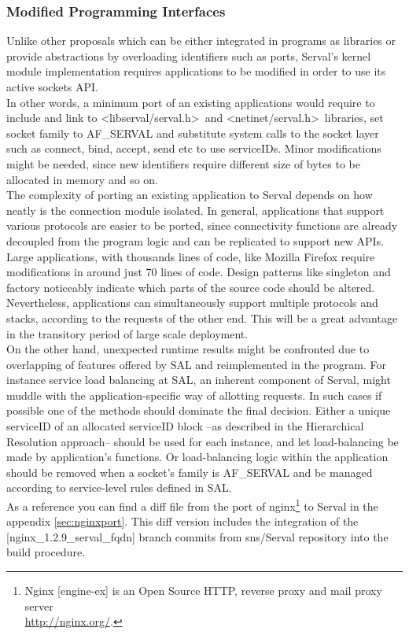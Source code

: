 \subsubsection{Modified Programming Interfaces}
Unlike other proposals which can be either integrated in programs as libraries or provide abstractions by overloading identifiers such as ports, Serval's kernel module implementation requires applications to be modified in order to use its active sockets API.
\\ \indent In other words, a minimum port of an existing applications would require to include and link to \textless libserval/serval.h\textgreater ~and \textless netinet/serval.h\textgreater ~libraries, set socket family to AF\_SERVAL and substitute system calls to the socket layer such as connect, bind, accept, send etc to use serviceIDs.
Minor modifications might be needed, since new identifiers require different size of bytes to be allocated in memory and so on.
\\ \indent The complexity of porting an existing application to Serval depends on how neatly is the connection module isolated.
In general, applications that support various protocols are easier to be ported, since connectivity functions are already decoupled from the program logic and can be replicated to support new APIs.
Large applications, with thousands lines of code, like Mozilla Firefox require modifications in around just 70 lines of code.
Design patterns like singleton and factory noticeably indicate which parts of the source code should be altered.
\\ \indent Nevertheless, applications can simultaneously support multiple protocols and stacks, according to the requests of the other end.
This will be a great advantage in the transitory period of large scale deployment.
\\ \indent On the other hand, unexpected runtime results might be confronted due to overlapping of features offered by SAL and reimplemented in the program.
For instance service load balancing at SAL, an inherent component of Serval, might muddle with the application-specific way of allotting requests.
In such cases if possible one of the methods should dominate the final decision.
Either a unique serviceID of an allocated serviceID block --as described in the Hierarchical Resolution approach-- should be used for each instance, and let load-balancing be made by application's functions.
Or load-balancing logic within the application should be removed when a socket's family is AF\_SERVAL and be managed according to service-level rules defined in SAL.
\\ \indent As a reference you can find a diff file from the port of nginx\footnote{Nginx [engine-ex] is an Open Source HTTP, reverse proxy and mail proxy server\\ \url{http://nginx.org/}.} to Serval in the appendix \ref{sec:nginxport}.
This diff version includes the integration of the [nginx\_1.2.9\_serval\_fqdn] branch commits from \mbox{sns/Serval} repository into the build procedure.

